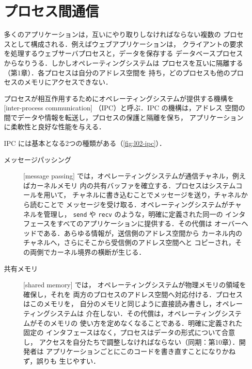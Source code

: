 \documentclass[../main.tex]{subfiles}
\begin{document}
\section{プロセス間通信}
\label{sec:l02-ipc}

多くのアプリケーションは，互いにやり取りしなければならない複数の
プロセスとして構成される．例えばウェブアプリケーションは，
クライアントの要求を処理するウェブサーバプロセスと，データを保存する
データベースプロセスからなりうる．しかしオペレーティングシステムは
プロセスを互いに隔離する（第1章）．各プロセスは自分のアドレス空間を
持ち，どのプロセスも他のプロセスのメモリにアクセスできない．

\begin{definition}[プロセス間通信]
  プロセスが相互作用するためにオペレーティングシステムが提供する機構を
  [inter-process communication]%
  （IPC）と呼ぶ．IPC の機構は，アドレス
  空間の間でデータや情報を転送し，プロセスの保護と隔離を保ち，
  アプリケーションに柔軟性と良好な性能を与える．
\end{definition}

IPC には基本となる2つの種類がある（\cref{fig:l02-ipc}）．
\begin{description}
  \item[メッセージパッシング]
    [message passing]%
    では，オペレーティングシステムが通信チャネル，例えばカーネルメモリ
    内の共有バッファを確立する．プロセスはシステムコールを用いて，
    チャネルに書き込むことでメッセージを送り，チャネルから読むことで
    メッセージを受け取る．オペレーティングシステムがチャネルを管理し，
    \texttt{send} や \texttt{recv} のような，明確に定義された同一の
    インタフェースをすべてのアプリケーションに提供する．その代償は
    オーバーヘッドである．あらゆる情報が，送信側のアドレス空間から
    カーネル内のチャネルへ，さらにそこから受信側のアドレス空間へと
    コピーされ，その両側でカーネル境界の横断が生じる．
  \item[共有メモリ] [shared memory]%
    では，%
    オペレーティングシステムが物理メモリの領域を確保し，それを
    両方のプロセスのアドレス空間へ対応付ける．プロセスはこのメモリを，
    自分のメモリと同じように直接読み書きし，オペレーティングシステムは
    介在しない．その代償は，オペレーティングシステムがそのメモリの
    使い方を定めなくなることである．明確に定義された固定の
    インタフェースはなく，プロセスはデータの形式について合意し，
    アクセスを自分たちで調整しなければならない（同期：第10章）．開発者は
    アプリケーションごとにこのコードを書き直すことになりかねず，誤りも
    生じやすい．
\end{description}
\end{document}
